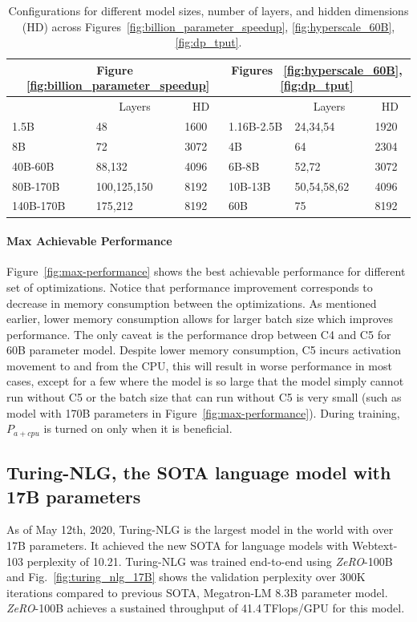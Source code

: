 \documentclass{article}
\newcommand{\name}{\emph{ZeRO}\xspace}
\begin{document}
\begin{table}[]
\centering
\begin{tabular}{|l|l|l|l|l|l|}
\hline
\multicolumn{3}{|c|}{Figure ~\ref{fig:billion_parameter_speedup}} & \multicolumn{3}{c|}{Figures ~\ref{fig:hyperscale_60B}, \ref{fig:dp_tput}} \\ \hline
\multicolumn{1}{|c|}{} & \multicolumn{1}{c|}{Layers} & \multicolumn{1}{c|}{HD} & \multicolumn{1}{c|}{} & \multicolumn{1}{c|}{Layers} & \multicolumn{1}{c|}{HD} \\ \hline
1.5B      & 48          & 1600 & 1.16B-2.5B  & 24,34,54    & 1920 \\ \hline
8B        & 72          & 3072 & 4B          & 64          & 2304 \\ \hline
40B-60B   & 88,132      & 4096 & 6B-8B       & 52,72       & 3072 \\ \hline
80B-170B  & 100,125,150 & 8192 & 10B-13B     & 50,54,58,62 & 4096 \\ \hline
140B-170B & 175,212     & 8192 & 60B         & 75          & 8192 \\ \hline
\end{tabular}
\caption{Configurations for different model sizes, number of layers, and hidden dimensions (HD) across Figures~\ref{fig:billion_parameter_speedup}, \ref{fig:hyperscale_60B}, \ref{fig:dp_tput}.} \label{tab:model-configuration}
\end{table}

\paragraph{Max Achievable Performance}
Figure~\ref{fig:max-performance} shows the best achievable performance for different set of optimizations. Notice that performance improvement corresponds to decrease in memory consumption between the optimizations. As mentioned earlier, lower memory consumption allows for larger batch size which improves performance. The only caveat is the performance drop between C4 and C5 for 60B parameter model. Despite lower memory consumption, C5 incurs activation movement to and from the CPU, this will result in worse performance in most cases, except for a few where the model is so large that the model simply cannot run without C5 or the batch size that can run without C5 is very small (such as model with 170B parameters in Figure~\ref{fig:max-performance}). During training, $P_{a+cpu}$ is turned on only when it is beneficial.
\subsection{Turing-NLG, the SOTA language model with 17B parameters}
As of May 12th, 2020, Turing-NLG is the largest model in the world with over 17B parameters. It achieved the new SOTA for language models with Webtext-103 perplexity of 10.21. Turing-NLG was trained end-to-end using \name-100B and Fig.~\ref{fig:turing_nlg_17B} shows the validation perplexity over 300K iterations compared to previous SOTA, Megatron-LM 8.3B parameter model. \name-100B achieves a sustained throughput of 41.4\,TFlops/GPU for this model.
\end{document}

